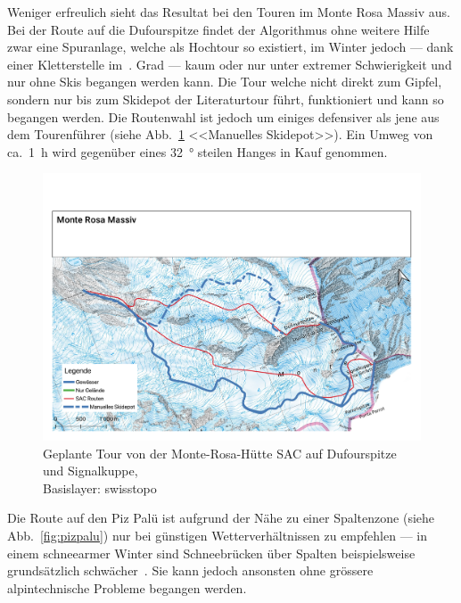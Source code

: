 
Weniger erfreulich sieht das Resultat bei den Touren im Monte Rosa Massiv aus. Bei der Route auf die Dufourspitze findet der Algorithmus ohne weitere Hilfe zwar eine Spuranlage, welche als Hochtour so existiert, im Winter jedoch --- dank einer Kletterstelle im~. Grad --- kaum oder nur unter extremer Schwierigkeit und nur ohne Skis begangen werden kann. 
Die Tour welche nicht direkt zum Gipfel, sondern nur bis zum Skidepot der Literaturtour führt, funktioniert und kann so begangen werden. Die Routenwahl ist jedoch um einiges defensiver als jene aus dem Tourenführer (siehe Abb.\ \ref{fig:monterosa} <<Manuelles Skidepot>>). Ein Umweg von ca.\ \qty{1}{h} wird gegenüber eines \qty{32}{°} steilen Hanges in Kauf genommen.

\begin{figure}[ht]
  \centering
  \includegraphics[page=1,width=.9\linewidth]{./../evaluation/PDFs/Monte Rosa Massiv.pdf}
  \caption{Geplante Tour von der Monte-Rosa-Hütte SAC auf Dufourspitze und Signalkuppe,\\Basislayer: swisstopo}\label{fig:monterosa}
\end{figure}

Die Route auf den Piz Palü ist aufgrund der Nähe zu einer Spaltenzone (siehe Abb.\ \ref{fig:pizpalu}) nur bei günstigen Wetterverhältnissen zu empfehlen --- in einem schneearmer Winter sind Schneebrücken über Spalten beispielsweise grundsätzlich schwächer~\cite{bergsteigenErhhtesRisiko}. Sie kann jedoch ansonsten ohne grössere alpintechnische Probleme begangen werden.

